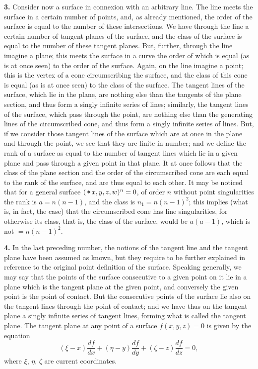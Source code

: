 \documentclass[11pt,a4paper]{article}
\begin{document}
\textbf{3.}\quad
Consider now a surface in connexion with an arbitrary line. The line meets the surface in a certain number of points, and, as already mentioned, the order of the surface is equal to the number of these intersections. We have through the line a certain number of tangent planes of the surface, and the class of the surface is equal to the number of these tangent planes. But, further, through the line imagine a plane; this meets the surface in a curve the order of which is equal (as is at once seen) to the order of the surface. Again, on the line imagine a point; this is the vertex of a cone circumscribing the surface, and the class of this cone is equal (as is at once seen) to the class of the surface. The tangent lines of the surface, which lie in the plane, are nothing else than the tangents of the plane section, and thus form a singly infinite series of lines; similarly, the tangent lines of the surface, which pass through the point, are nothing else than the generating lines of the circumscribed cone, and thus form a singly infinite series of lines. But, if we consider those tangent lines of the surface which are at once in the plane and through the point, we see that they are finite in number; and we define the rank of a surface as equal to the number of tangent lines which lie in a given plane and pass through a given point in that plane. It at once follows that the class of the plane section and the order of the circumscribed cone are each equal to the rank of the surface, and are thus equal to each other. It may be noticed that for a general surface $(\,\raisebox{0.15ex}{\ensuremath{*\!\!\!*}}\, x, y, z, w)^{n} = 0$, of order $n$ without point singularities the rank is $a = n(n - 1)$, and the class is $n_{1} = n(n - 1)^{2}$; this implies (what is, in fact, the case) that the circumscribed cone has line singularities, for otherwise its class, that is, the class of the surface, would be $a(a - 1)$, which is not $= n(n - 1)^{2}$.

\textbf{4.}\quad
In the last preceding number, the notions of the tangent line and the tangent plane have been assumed as known, but they require to be further explained in reference to the original point definition of the surface. Speaking generally, we may say that the points of the surface consecutive to a given point on it lie in a plane which is the tangent plane at the given point, and conversely the given point is the point of contact. But the consecutive points of the surface lie also on the tangent lines through the point of contact; and we have thus on the tangent plane a singly infinite series of tangent lines, forming what is called the tangent plane. The tangent plane at any point of a surface $f(x, y, z) = 0$ is given by the equation
\[
(\xi - x)\frac{df}{dx} + (\eta - y)\frac{df}{dy} + (\zeta - z)\frac{df}{dz} = 0,
\]
where $\xi$, $\eta$, $\zeta$ are current coordinates.
\end{document}
